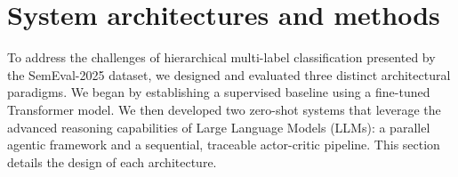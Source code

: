 \chapter{System architectures and methods}
\label{ch:system_architectures}

To address the challenges of hierarchical multi-label classification presented by the SemEval-2025 dataset, we designed and evaluated three distinct architectural paradigms. We began by establishing a supervised baseline using a fine-tuned Transformer model. We then developed two zero-shot systems that leverage the advanced reasoning capabilities of Large Language Models (LLMs): a parallel agentic framework and a sequential, traceable actor-critic pipeline. This section details the design of each architecture.



